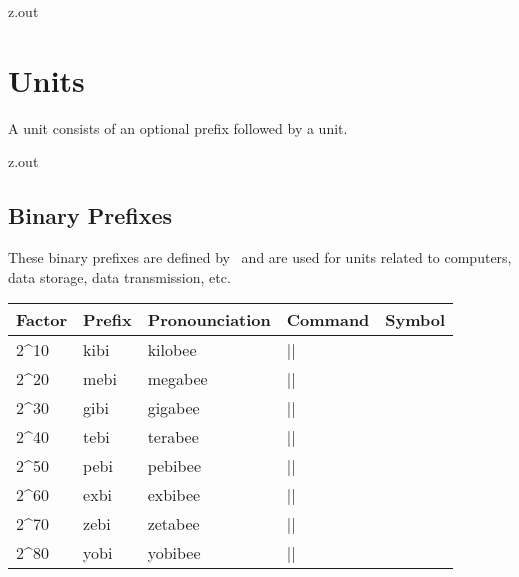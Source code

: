 \MyIO


\begin{VerbatimOut}{z.out}


\section{Units}

A unit consists of an optional prefix
followed by a unit.
\end{VerbatimOut}

\MyIO


\begin{VerbatimOut}{z.out}

\subsection{Binary Prefixes}

These binary prefixes are defined by \siunitxLogo\ and
are used for units related to computers,
data storage,
data transmission,
etc.
  
\begin{inlinetable}
  \begin{tabular}{@{}mllll@{}}
    \toprule
    \textbf{Factor}& \textbf{Prefix}& \textbf{Pronounciation}& \textbf{Command}& \textbf{Symbol}\\
    \midrule
    2^{10}& kibi& kilobee& |\kibi|& \unit{\kibi\nounit}\\
    2^{20}& mebi& megabee& |\mebi|& \unit{\mebi\nounit}\\
    2^{30}& gibi& gigabee& |\gibi|& \unit{\gibi\nounit}\\
    2^{40}& tebi& terabee& |\tebi|& \unit{\tebi\nounit}\\
    2^{50}& pebi& pebibee& |\pebi|& \unit{\pebi\nounit}\\
    2^{60}& exbi& exbibee& |\exbi|& \unit{\exbi\nounit}\\
    2^{70}& zebi& zetabee& |\zebi|& \unit{\zebi\nounit}\\
    2^{80}& yobi& yobibee& |\yobi|& \unit{\yobi\nounit}\\
    \bottomrule
  \end{tabular}
\end{inlinetable}
\end{VerbatimOut}

\MyIO


